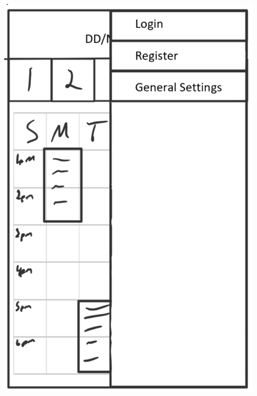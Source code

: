 \documentclass{scrreprt}
\begin{document}
\begin{center}
\includegraphics{hmlogout.PNG}
\end{center}
\end{document}
